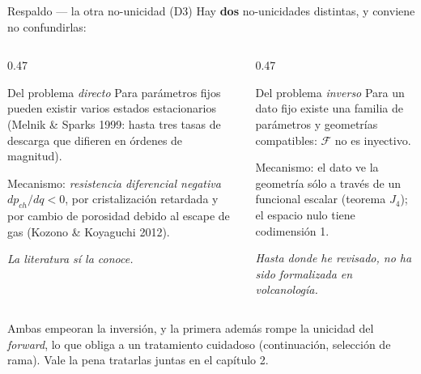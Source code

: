 \documentclass[aspectratio=169,10pt,t]{beamer}
\begin{document}
\begin{frame}{Respaldo — la otra no-unicidad (D3)}
\small
Hay \textbf{dos} no-unicidades distintas, y conviene no confundirlas:

\vspace{0.8em}
\begin{columns}[T]
\begin{column}{0.47\textwidth}
\begin{block}{Del problema \emph{directo}}
Para parámetros fijos pueden existir \alert{varios estados estacionarios}
(Melnik \& Sparks 1999: hasta tres tasas de descarga que difieren en órdenes de
magnitud).

\smallskip
Mecanismo: \emph{resistencia diferencial negativa} $dp_{ch}/dq<0$, por
cristalización retardada y por cambio de porosidad debido al escape de gas
(Kozono \& Koyaguchi 2012).

\smallskip
\emph{La literatura sí la conoce.}
\end{block}
\end{column}
\begin{column}{0.47\textwidth}
\begin{block}{Del problema \emph{inverso}}
Para un dato fijo existe una \alert{familia de parámetros y geometrías}
compatibles: $\mathcal{F}$ no es inyectivo.

\smallskip
Mecanismo: el dato ve la geometría sólo a través de un funcional escalar
(teorema $J_4$); el espacio nulo tiene codimensión 1.

\smallskip
\emph{Hasta donde he revisado, no ha sido formalizada en volcanología.}
\end{block}
\end{column}
\end{columns}

\vspace{0.8em}
Ambas empeoran la inversión, y la primera además rompe la unicidad del
\emph{forward}, lo que obliga a un tratamiento cuidadoso (continuación,
selección de rama). Vale la pena tratarlas juntas en el capítulo 2.
\end{frame}
\end{document}
